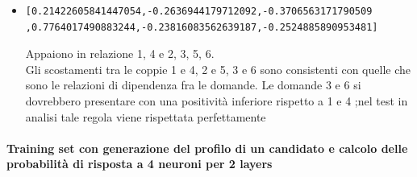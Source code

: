 \begin{itemize}
\item \begin{verbatim}[0.21422605841447054,-0.2636944179712092,-0.3706563171790509
,0.7764017490883244,-0.23816083562639187,-0.2524885890953481]\end{verbatim}
Appaiono in relazione 1, 4 e 2, 3, 5, 6.\\
Gli scostamenti tra le coppie  1 e 4, 2 e 5, 3 e 6 sono consistenti con quelle che sono le relazioni di dipendenza fra le domande.
Le domande 3 e 6 si dovrebbero presentare con una positivit\`a inferiore rispetto a 1 e 4 ;nel test in analisi tale regola viene rispettata perfettamente
\end{itemize}


\paragraph{Training set con generazione del profilo di un candidato e calcolo delle probabilit\`a di risposta a 4 neuroni per 2 layers}\mbox{}
\label{Training set con generazione del profilo di un candidato e calcolo delle probabilita di risposta a 4 neuroni}
\\
\noindent
